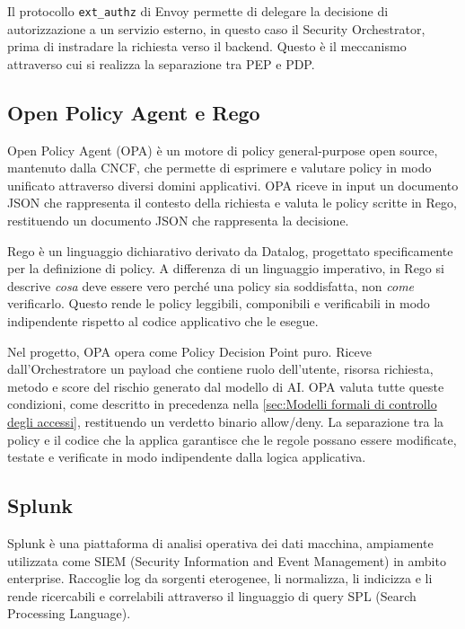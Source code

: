 Il protocollo \texttt{ext\_authz} di Envoy permette di delegare la decisione di autorizzazione a un servizio esterno, in questo caso il Security Orchestrator, prima di instradare la richiesta verso il backend. Questo è il meccanismo attraverso cui si realizza la separazione tra PEP e PDP.

\subsection{Open Policy Agent e Rego}

Open Policy Agent (OPA) è un motore di policy general-purpose open source, mantenuto dalla CNCF, che permette di esprimere e valutare policy in modo unificato attraverso diversi domini applicativi. OPA riceve in input un documento JSON che rappresenta il contesto della richiesta e valuta le policy scritte in Rego, restituendo un documento JSON che rappresenta la decisione.

Rego è un linguaggio dichiarativo derivato da Datalog, progettato specificamente per la definizione di policy. A differenza di un linguaggio imperativo, in Rego si descrive \textit{cosa} deve essere vero perché una policy sia soddisfatta, non \textit{come} verificarlo. Questo rende le policy leggibili, componibili e verificabili in modo indipendente rispetto al codice applicativo che le esegue.

Nel progetto, OPA opera come Policy Decision Point puro. Riceve dall'Orchestratore un payload che contiene ruolo dell'utente, risorsa richiesta, metodo e score del rischio generato dal modello di AI. OPA valuta tutte queste condizioni, come descritto in precedenza nella \autoref{sec:Modelli formali di controllo degli accessi}, restituendo un verdetto binario allow/deny. La separazione tra la policy e il codice che la applica garantisce che le regole possano essere modificate, testate e verificate in modo indipendente dalla logica applicativa.

\subsection{Splunk}

Splunk è una piattaforma di analisi operativa dei dati macchina, ampiamente utilizzata come SIEM (Security Information and Event Management) in ambito enterprise. Raccoglie log da sorgenti eterogenee, li normalizza, li indicizza e li rende ricercabili e correlabili attraverso il linguaggio di query SPL (Search Processing Language).

